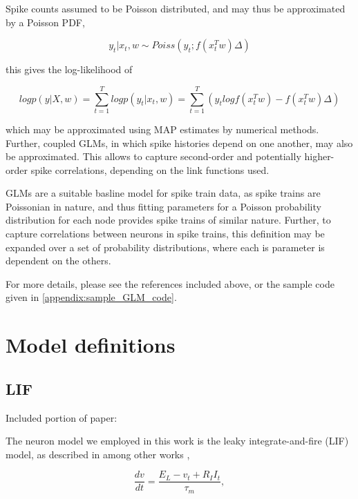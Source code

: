 \documentclass[mphil,deptreport,ai]{infthesis} %
\begin{document}
\cite{Nelder1972, Fernandez2000}

Spike counts assumed to be Poisson distributed, and may thus be approximated by a Poisson PDF,

\begin{equation}
    y_t|x_t, w \sim Poiss(y_t; f(x_t^T w)\Delta)
\end{equation}

this gives the log-likelihood of

\begin{equation}
    log p(y|X, w) = \sum_{t=1}^T log p(y_t| x_t, w) = \sum_{t=1}^T(y_t log f(x_t^Tw) - f(x_t^Tw)\Delta)
\end{equation}

which may be approximated using MAP estimates by numerical methods.
Further, coupled GLMs, in which spike histories depend on one another, may also be approximated. This allows to capture second-order and potentially higher-order spike correlations, depending on the link functions used.

GLMs are a suitable basline model for spike train data, as spike trains are Poissonian in nature, and thus fitting parameters for a Poisson probability distribution for each node provides spike trains of similar nature.
Further, to capture correlations between neurons in spike trains, this definition may be expanded over a set of probability distributions, where each is parameter is dependent on the others.

For more details, please see the references included above, or the sample code given in \ref{appendix:sample_GLM_code}.


\section{Model definitions}

\subsection{LIF}

Included portion of paper:

The neuron model we employed in this work is the leaky integrate-and-fire (LIF) model, as described in among other works \cite{Rolls1998Book},

\begin{equation}
    \frac{dv}{dt} = \frac{E_L - v_t + R_I I_t}{\tau_m},
\end{equation}
\end{document}
